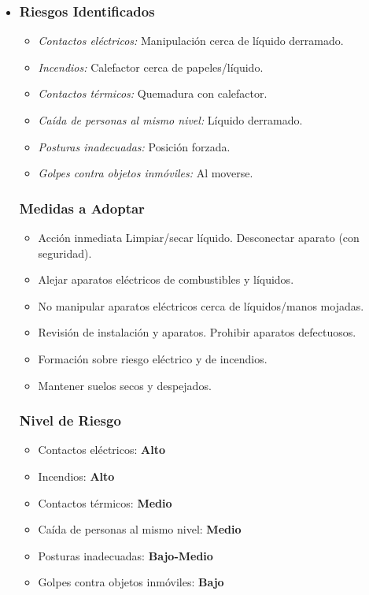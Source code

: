 \documentclass[12pt,a4paper]{article}
\begin{document}
	\begin{itemize}
		\item \subsubsection{Riesgos Identificados}
		\begin{itemize}
			\item \textit{Contactos eléctricos:} Manipulación cerca de líquido derramado.
			\item \textit{Incendios:} Calefactor cerca de papeles/líquido.
			\item \textit{Contactos térmicos:} Quemadura con calefactor.
			\item \textit{Caída de personas al mismo nivel:} Líquido derramado.
			\item \textit{Posturas inadecuadas:} Posición forzada.
			\item \textit{Golpes contra objetos inmóviles:} Al moverse.
		\end{itemize}
		\subsubsection{Medidas a Adoptar}
		\begin{itemize}
			\item Acción inmediata Limpiar/secar líquido. Desconectar aparato (con seguridad).
			\item Alejar aparatos eléctricos de combustibles y líquidos.
			\item No manipular aparatos eléctricos cerca de líquidos/manos mojadas.
			\item Revisión de instalación y aparatos. Prohibir aparatos defectuosos.
			\item Formación sobre riesgo eléctrico y de incendios.
			\item Mantener suelos secos y despejados.
		\end{itemize}
		\subsubsection{Nivel de Riesgo}
		\begin{itemize}
			\item Contactos eléctricos: \textbf{Alto}
			\item Incendios: \textbf{Alto}
			\item Contactos térmicos: \textbf{Medio}
			\item Caída de personas al mismo nivel: \textbf{Medio}
			\item Posturas inadecuadas: \textbf{Bajo-Medio}
			\item Golpes contra objetos inmóviles: \textbf{Bajo}
		\end{itemize}
	\end{itemize}
	
\end{document}

